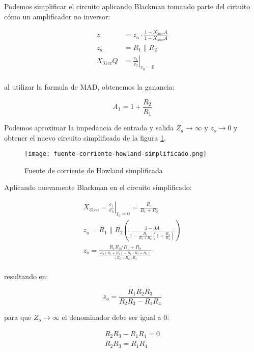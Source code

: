Podemos simplificar el circuito aplicando Blackman tomando parte del cirtuito cómo un amplificador no inversor:

\begin{align*}
    z & = z_a \cdot \frac{1 - X_{3icc}A}{1 - X_{3ica}A} \\
    z_a & = R_1 \parallel R_2 \\
    X_{31cc} Q& = \left. \frac{e_1}{e_3} \right|_{v_a=0} \\
\end{align*}

al utilizar la formula de MAD, obtenemos la ganancia:

\begin{equation}
    A_1 = 1 + \frac{R_2}{R_1}
\end{equation}

Podemos aproximar la impedancia de entrada y salida $Z_d \rightarrow \infty $ y $z_o \rightarrow 0$ y obtener el nuevo circuito simplificado de la figura \ref{fig:mt-fuente-corriente-howland-simplificado}.

\begin{figure}[ht]
    \centering
    \texttt{[image: fuente-corriente-howland-simplificado.png]}
    \caption{Fuente de corriente de Howland simplificada}
    \label{fig:mt-fuente-corriente-howland-simplificado}    
\end{figure}

Aplicando nuevamente Blackman en el circuito simplificado:

\begin{align*}
    X_{31ca} = \left. \frac{e_1}{e_3} \right|_{I_a=0} = \frac{R_1}{R_1 + R_2} \\
    z_o = R_1 \parallel R_2 (\frac{1 - 0A}{1 - \frac{R_1}{R_1 + R_2}(1 + \frac{R_4}{R_3})}) \\
    z_o = \frac{R_1 R_2 / R_1 + R_2}{\frac{R_3(R_1 + R_2) - R_1(R_3 + R_4)}{(R_1 + R_2)R_3}} \\
\end{align*}

resultando en:

\begin{equation}
    z_o = \frac{R_1 R_2 R_3}{R_2 R_3 - R_1 R_4}
\end{equation}

para que $Z_o \rightarrow\infty$ el denominador debe ser igual a 0:

\begin{align*}
    R_2 R_3 - R_1 R_4 = 0 \\
    R_2 R_3 = R_1 R_4
\end{align*}

